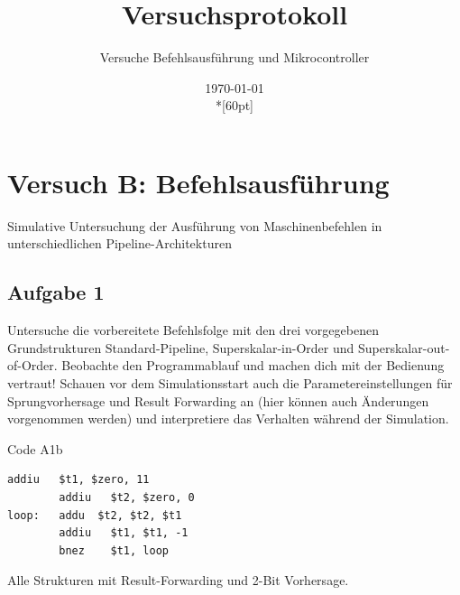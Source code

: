 \documentclass[a4paper,12pt,titlepage]{scrartcl}
\begin{document}
\titlehead
{
    \small
    {
        Technische Universität Ilmenau\\
        Fakulät IA\\
        Fachgebiet Rechnerarchitektur\\

        Praktikum Rechnerarchitektur 2\\
        WS 2021/22}
}

\title {Versuchsprotokoll}
\subtitle{Versuche Befehlsausführung und Mikrocontroller}
\author{}
\date{\today\\*[60pt]}
\maketitle  %

\pagestyle{fancy}
\newpage

\section*{Versuch B: Befehlsausführung}
Simulative Untersuchung der Ausführung von Maschinenbefehlen in unterschiedlichen Pipeline-Architekturen

\subsection*{Aufgabe 1}
Untersuche die vorbereitete Befehlsfolge mit den drei vorgegebenen Grundstrukturen Standard-Pipeline, Superskalar-in-Order und Superskalar-out-of-Order. Beobachte den Programmablauf und machen dich mit der Bedienung vertraut! Schauen vor dem Simulationsstart auch die Parametereinstellungen für Sprungvorhersage und Result Forwarding an (hier können auch Änderungen vorgenommen werden) und interpretiere das Verhalten während der Simulation.

Code A1b
\begin{lstlisting}[basicstyle=\tiny]
        addiu   $t1, $zero, 11
        addiu   $t2, $zero, 0
loop:   addu  $t2, $t2, $t1
        addiu   $t1, $t1, -1
        bnez    $t1, loop
\end{lstlisting}
Alle Strukturen mit Result-Forwarding und 2-Bit Vorhersage.
\end{document}
